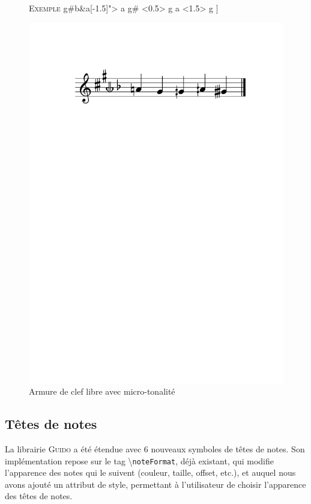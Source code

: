 \documentclass{article}
\newenvironment{gmncode}	{\vspace{-2mm}\small\verbatim}{\endverbatim\vspace{-2mm}}
\newcommand{\guido}			{\textsc{Guido}}
\newcommand{\code}[1]		{{\small \texttt{#1}}}
\newcommand{\guidotag}[1]	{\textbackslash\code{#1}}
\newcommand{\exemple}		{\vspace{2mm}\hspace*{-3mm}\textsc{Exemple}}
\begin{document}
\begin{figure}[h]
\exemple
\begin{gmncode}
[
  \key<"free=c[1.5]g#b&a[-1.5]"> a g# 
  \alter<0.5> g  a \alter<1.5> g 
]
\end{gmncode}
\begin{center}
\includegraphics[width=0.75\columnwidth]{img/partitions/freekey.pdf}
\end{center}
\caption{Armure de clef libre avec micro-tonalité}
\label{fig:freekey}
\end{figure}


\subsection{Têtes de notes}\label{subsec:tetes_notes}

La librairie \guido{} a été étendue avec 6 nouveaux symboles de têtes de notes. Son implémentation repose sur le tag \guidotag{noteFormat}, déjà existant, qui modifie l'apparence des notes qui le suivent (couleur, taille, offset, etc.), et auquel nous avons ajouté un attribut de style, permettant à l'utilisateur de choisir l'apparence des têtes de notes.
\end{document}
